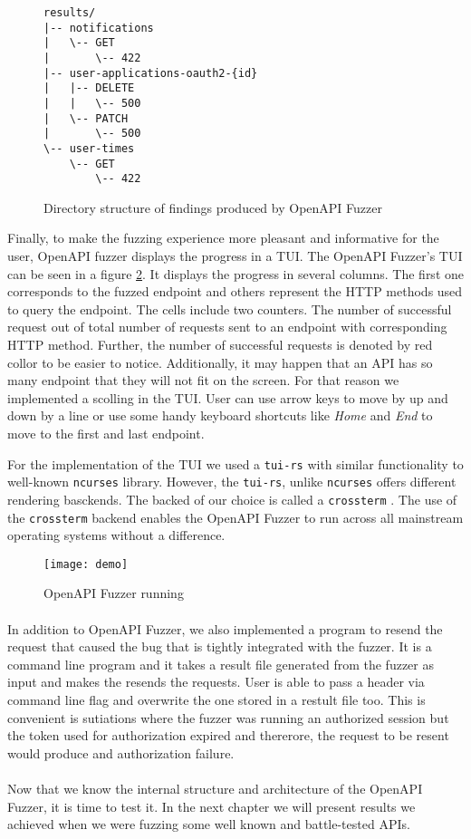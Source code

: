 \begin{figure}[h]
\begin{verbatim}
results/
|-- notifications
|   \-- GET
|       \-- 422
|-- user-applications-oauth2-{id}
|   |-- DELETE
|   |   \-- 500
|   \-- PATCH
|       \-- 500
\-- user-times
    \-- GET
        \-- 422
\end{verbatim}
\caption{Directory structure of findings produced by OpenAPI Fuzzer}
\label{fig:openapi-fuzzer-results}
\end{figure}

Finally, to make the fuzzing experience more pleasant and informative for the user, OpenAPI fuzzer displays the progress in a TUI. The OpenAPI Fuzzer's TUI can be seen in a figure \ref{fig:openapi-fuzzer-run}. It displays the progress in several columns. The first one corresponds to the fuzzed endpoint and others represent the HTTP methods used to query the endpoint. The cells include two counters. The number of successful request out of total number of requests sent to an endpoint with corresponding HTTP method. Further, the number of successful requests is denoted by red collor to be easier to notice. Additionally, it may happen that an API has so many endpoint that they will not fit on the screen. For that reason we implemented a scolling in the TUI. User can use arrow keys to move by up and down by a line or use some handy keyboard shortcuts like \textit{Home} and \textit{End} to move to the first and last endpoint.

For the implementation of the TUI we used a \texttt{tui-rs} \cite{tuirs2020github} with similar functionality to well-known \texttt{ncurses} library. However, the \texttt{tui-rs}, unlike \texttt{ncurses} offers different rendering basckends. The backed of our choice is called a \texttt{crossterm} \cite{crossterm2020github}. The use of the \texttt{crossterm} backend enables the OpenAPI Fuzzer to run across all mainstream operating systems without a difference.

\begin{figure}
\texttt{[image: demo]}
\caption{OpenAPI Fuzzer running}
\label{fig:openapi-fuzzer-run}
\end{figure}

\paragraph{}
In addition to OpenAPI Fuzzer, we also implemented a program to resend the request that caused the bug that is tightly integrated with the fuzzer. It is a command line program and it takes a result file generated from the fuzzer as input and makes the resends the requests. User is able to pass a header via command line flag and overwrite the one stored in a restult file too. This is convenient is sutiations where the fuzzer was running an authorized session but the token used for authorization expired and thererore, the request to be resent would produce and authorization failure.

\paragraph{}
Now that we know the internal structure and architecture of the OpenAPI Fuzzer, it is time to test it. In the next chapter we will present results we achieved when we were fuzzing some well known and battle-tested APIs.
